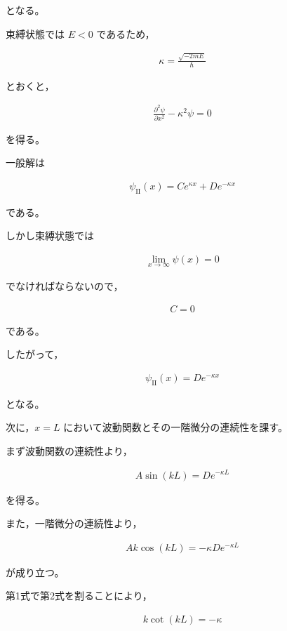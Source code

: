 \documentclass[platex,dvipdfmx,a4paper]{jsarticle}
\newcommand{\nhb}[3]{\frac{\partial^{#1} #2}{\partial #3^{#1}}}
\begin{document}
となる。

束縛状態では $E<0$ であるため，

\begin{align*}
\kappa
=
\frac{\sqrt{-2mE}}{\hbar}
\end{align*}

とおくと，

\begin{align*}
\nhb{2}{\psi}{x}
-\kappa^2\psi
=
0
\end{align*}

を得る。

一般解は

\begin{align*}
\psi_{\mathrm{II}}(x)
=
Ce^{\kappa x}
+
De^{-\kappa x}
\end{align*}

である。

しかし束縛状態では

\begin{align*}
\lim_{x\to\infty}\psi(x)=0
\end{align*}

でなければならないので，

\begin{align*}
C=0
\end{align*}

である。

したがって，

\begin{align*}
\psi_{\mathrm{II}}(x)
=
De^{-\kappa x}
\end{align*}

となる。

次に，$x=L$ において波動関数とその一階微分の連続性を課す。

まず波動関数の連続性より，

\begin{align*}
A\sin(kL)
=
De^{-\kappa L}
\end{align*}

を得る。

また，一階微分の連続性より，

\begin{align*}
Ak\cos(kL)
=
-\kappa De^{-\kappa L}
\end{align*}

が成り立つ。

第1式で第2式を割ることにより，

\begin{align*}
k\cot(kL)
=
-\kappa
\end{align*}
\end{document}
